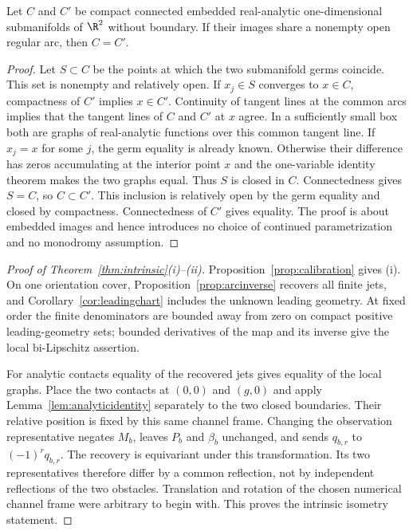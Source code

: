 \begin{lemma}
\label{lem:analyticidentity}
Let $C$ and $C'$ be compact connected embedded real-analytic
one-dimensional submanifolds of $\R^2$ without boundary. If their
images share a nonempty open regular arc, then $C=C'$.
\end{lemma}
\begin{proof}
Let $S\subset C$ be the points at which the two submanifold germs
coincide. This set is nonempty and relatively open. If $x_j\in S$
converges to $x\in C$, compactness of $C'$ implies $x\in C'$.
Continuity of tangent lines at the common arcs implies that the tangent
lines of $C$ and $C'$ at $x$ agree. In a sufficiently small box both
are graphs of real-analytic functions over this common tangent line.
If $x_j=x$ for some $j$, the germ equality is already known.
Otherwise their difference has zeros accumulating at the interior point
$x$ and the one-variable identity theorem makes the two graphs equal.
Thus $S$ is closed in $C$. Connectedness gives $S=C$, so $C\subset C'$.
This inclusion is relatively open by the germ equality and closed by
compactness. Connectedness of $C'$ gives equality. The proof is about
embedded images and hence introduces no choice of continued
parametrization and no monodromy assumption.
\end{proof}

\begin{proof}[Proof of Theorem~\ref{thm:intrinsic}(i)--(ii)]
Proposition~\ref{prop:calibration} gives (i). On one orientation cover,
Proposition~\ref{prop:arcinverse} recovers all finite jets, and
Corollary~\ref{cor:leadingchart} includes the unknown leading geometry.
At fixed order the finite denominators are bounded away from zero on
compact positive leading-geometry sets; bounded derivatives of the map
and its inverse give the local bi-Lipschitz assertion.

For analytic contacts equality of the recovered jets gives equality of
the local graphs. Place the two contacts at $(0,0)$ and $(g,0)$ and
apply Lemma~\ref{lem:analyticidentity} separately to the two closed
boundaries. Their relative position is fixed by this same channel frame.
Changing the observation representative negates $M_b$, leaves $P_b$
and $\beta_b$ unchanged, and sends $q_{b,r}$ to $(-1)^rq_{b,r}$.
The recovery is equivariant under this transformation. Its two
representatives therefore differ by a common reflection, not by
independent reflections of the two obstacles. Translation and rotation
of the chosen numerical channel frame were arbitrary to begin with.
This proves the intrinsic isometry statement.
\end{proof}
